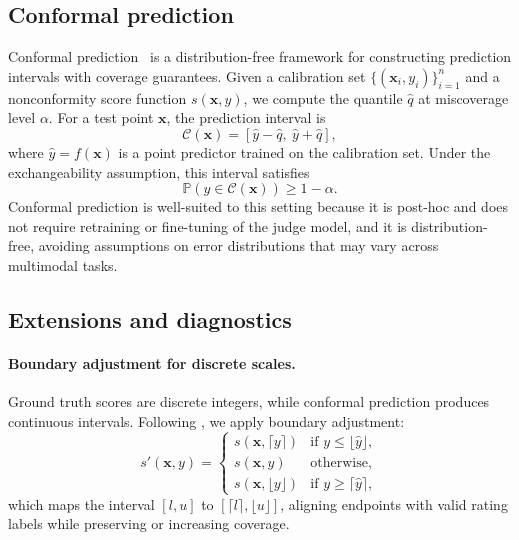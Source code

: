 \documentclass{article}
\begin{document}
\subsection{Conformal prediction}

Conformal prediction~\citep{vovk2005algorithmic} is a distribution-free framework for constructing prediction intervals with coverage guarantees. Given a calibration set $\{(\mathbf{x}_i, y_i)\}_{i=1}^n$ and a nonconformity score function $s(\mathbf{x}, y)$, we compute the quantile $\hat{q}$ at miscoverage level $\alpha$. For a test point $\mathbf{x}$, the prediction interval is
\begin{equation}
\mathcal{C}(\mathbf{x}) = [\hat{y} - \hat{q},\ \hat{y} + \hat{q}],
\end{equation}
where $\hat{y} = f(\mathbf{x})$ is a point predictor trained on the calibration set. Under the exchangeability assumption, this interval satisfies
\begin{equation}
\mathbb{P}(y \in \mathcal{C}(\mathbf{x})) \geq 1 - \alpha.
\end{equation}
Conformal prediction is well-suited to this setting because it is post-hoc and does not require retraining or fine-tuning of the judge model, and it is distribution-free, avoiding assumptions on error distributions that may vary across multimodal tasks.

\subsection{Extensions and diagnostics}

\paragraph{Boundary adjustment for discrete scales.}
Ground truth scores are discrete integers, while conformal prediction produces continuous intervals. Following \citet{sheng2025analyzing}, we apply boundary adjustment:
\begin{equation}
s'(\mathbf{x}, y) =
\begin{cases}
s(\mathbf{x}, \lceil y \rceil) & \text{if } y \leq \lfloor \hat{y} \rfloor, \\
s(\mathbf{x}, y) & \text{otherwise,} \\
s(\mathbf{x}, \lfloor y \rfloor) & \text{if } y \geq \lceil \hat{y} \rceil,
\end{cases}
\end{equation}
which maps the interval $[l, u]$ to $[\lceil l \rceil, \lfloor u \rfloor]$, aligning endpoints with valid rating labels while preserving or increasing coverage.
\end{document}
